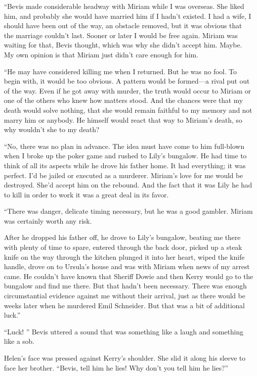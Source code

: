 {“Bevis made considerable headway with Miriam while I was overseas. She liked him, and probably she would have married him if I hadn’t existed. I had a wife, I should have been out of the way, an obstacle removed, but it was obvious that the marriage couldn’t last. Sooner or later I would be free again. Miriam was waiting for that, Bevis thought, which was why she didn’t accept him. Maybe. My own opinion is that Miriam just didn’t care enough for him.

“He may have considered killing me when I returned. But he was no fool. To begin with, it would be too obvious. A pattern would be formed—a rival put out of the way. Even if he got away with murder, the truth would occur to Miriam or one of the others who knew how matters stood. And the chances were that my death would solve nothing, that she would remain faithful to my memory and not marry him or anybody. He himself would react that way to Miriam’s death, so why wouldn’t she to my death?

“No, there was no plan in advance. The idea must have come to him full-blown when I broke up the poker game and rushed to Lily’s bungalow. He had time to think of all its aspects while he drove his father home. It had everything; it was perfect. I’d be jailed or executed as a murderer. Miriam’s love for me would be destroyed. She’d accept him on the rebound. And the fact that it was Lily he had to kill in order to work it was a great deal in its favor.

“There was danger, delicate timing necessary, but he was a good gambler. Miriam was certainly worth any risk.

After he dropped his father off, he drove to Lily’s bungalow, beating me there with plenty of time to spare, entered through the back door, picked up a steak knife on the way through the kitchen plunged it into her heart, wiped the knife handle, drove on to Ursula’s house and was with Miriam when news of my arrest came. He couldn’t have known that Sheriff Dowie and then Kerry would go to the bungalow and find me there. But that hadn’t been necessary. There was enough circumstantial evidence against me without their arrival, just as there would be weeks later when he murdered Emil Schneider. But that was a bit of additional luck.”

“Luck! ” Bevis uttered a sound that was something like a laugh and something like a sob.

Helen’s face was pressed against Kerry’s shoulder. She slid it along his sleeve to face her brother. “Bevis, tell him he lies! Why don’t you tell him he lies?”

}
